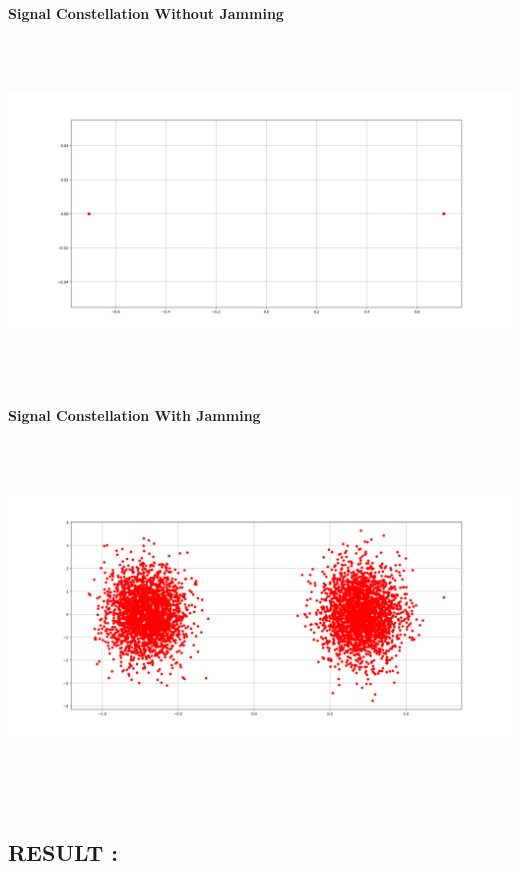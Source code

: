 \documentclass[a4paper,10pt]{article}
\begin{document}
\begin{center}
\newpage
\vspace*{1cm}
\large{\textbf{Signal Constellation Without Jamming}}\\
\includegraphics[width=15cm, height=10cm]{fig7}\\
\vspace*{1cm}
\large{\textbf{Signal Constellation With Jamming}}\\
\includegraphics[width=15cm, height=10cm]{fig8}\\

\end{center}

\begin{flushleft}
\vspace*{1cm}
\section{\selectfont RESULT :}
\end{flushleft}
\end{document}
